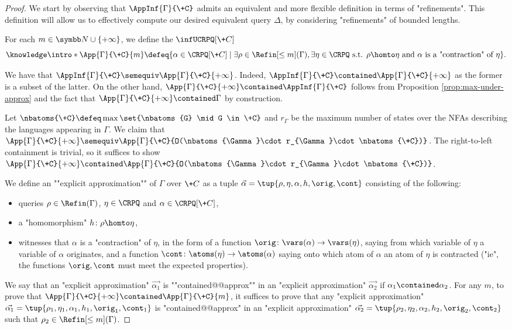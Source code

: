 \begin{proof}
	We start by observing that $\AppInf{\Gamma}{\+C}$ admits an equivalent and more flexible definition in terms of "refinements". This definition will allow us to effectively compute our desired equivalent query $\Delta$, by considering "refinements" of bounded lengths.

	For each $m \in \N\cup\{+\infty\}$, we define the $\infUCRPQ[\+C]$
	\[\AP\intro*\App{\Gamma}{\+C}{m} \defeq \{
		\alpha \in \CRPQ[\+C] \mid \exists \rho \in \Refin[\leq m](\Gamma), 
		\exists \eta \in \CRPQ \text{ s.t. }
		\rho \homto \eta \text{ and } \alpha \text{ is a "contraction" of } \eta
	\}.\]

	We have that $\AppInf{\Gamma}{\+C}\semequiv \App{\Gamma}{\+C}{+\infty}$. Indeed, $\AppInf{\Gamma}{\+C}\contained \App{\Gamma}{\+C}{+\infty}$ as the former is a subset of the latter. On the other hand, $\App{\Gamma}{\+C}{+\infty}\contained \AppInf{\Gamma}{\+C}$ follows from Proposition \ref{prop:max-under-approx} and the fact that $\App{\Gamma}{\+C}{+\infty}\contained \Gamma$ by construction.
	
	Let $\nbatoms{\+C}\defeq \max{\set{\nbatoms{G} \mid G \in \+C}}$ and $r_{\Gamma}$ be the maximum number of states over the NFAs describing the languages appearing in $\Gamma$. 
	We claim that $\App{\Gamma}{\+C}{+\infty} \semequiv \App{\Gamma}{\+C}{O(\nbatoms{\Gamma}\cdot r_{\Gamma}\cdot \nbatoms{\+C})}$.
	The right-to-left containment is trivial, so it suffices to show
	$\App{\Gamma}{\+C}{+\infty} \contained \App{\Gamma}{\+C}{O(\nbatoms{\Gamma}\cdot r_{\Gamma}\cdot \nbatoms{\+C})}$.

	We define an \AP""explicit approximation"" of $\Gamma$ over $\+C$ as a tuple
	$\vec{\alpha} = \tup{\rho, \eta, \alpha, h, \orig, \cont}$ consisting of the following:
	\begin{itemize}
		\item queries $\rho \in \Refin(\Gamma)$, $\eta \in \CRPQ$ and
			$\alpha \in \CRPQ[\+C]$,
		\item a "homomorphism" $h\colon \rho \homto \eta$,
		\item witnesses that $\alpha$ is a "contraction" of $\eta$, in the form of
			a function $\orig \colon \vars(\alpha) \to \vars(\eta)$,
			saying from which variable of $\eta$ a variable of $\alpha$ originates,
			and a function $\cont \colon \atoms(\eta) \to \atoms(\alpha)$
			saying onto which atom of $\alpha$ an atom of $\eta$ is contracted ("ie", the functions $\orig,\cont$ must meet the expected properties).
	\end{itemize}
	We say that an "explicit approximation" $\vec{\alpha_1}$ is \AP""contained@@approx"" in
	an "explicit approximation" $\vec{\alpha_2}$ if $\alpha_1 \contained \alpha_2$.
	For any $m$, to prove that $\App{\Gamma}{\+C}{+\infty} \contained \App{\Gamma}{\+C}{m}$,
	it suffices to prove that any "explicit approximation" $\vec{\alpha_1}=\tup{\rho_1, \eta_1, \alpha_1, h_1, \orig_1, \cont_1}$ is "contained@@approx"
	in an "explicit approximation" $\vec{\alpha_2}=\tup{\rho_2, \eta_2, \alpha_2, h_2, \orig_2, \cont_2}$ such that $\rho_2 \in \Refin[\leq m](\Gamma)$.


\end{proof}
